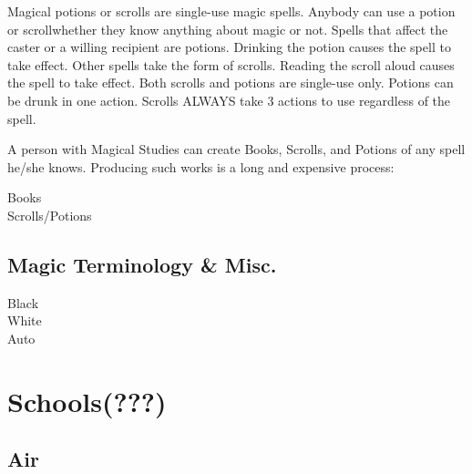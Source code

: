 \documentclass[twoside]{book}
\begin{document}
    {  
     Magical potions or scrolls are single-use magic
               spells. Anybody can use a potion or scrollwhether
               they know anything about magic or not. Spells that affect
               the caster or a willing recipient are potions. Drinking
               the potion causes the spell to take effect. Other spells
               take the form of scrolls. Reading the scroll aloud causes
               the spell to take effect. Both scrolls and potions are
               single-use only. Potions can be drunk in one action.
               Scrolls ALWAYS take 3 actions to use regardless of the
               spell. 
    }
  
    {  
     A person with Magical Studies can create Books,
               Scrolls, and Potions of any spell he/she knows. Producing
               such works is a long and expensive process: 
    }
  
\begin{description}
    
  \item[ Books ] 
  \item[ Scrolls/Potions ] 
\end{description}
  
    

\subsection{Magic Terminology \& Misc.}
    
\begin{description}
    
  \item[ Black ] 
  \item[ White ] 
  \item[ Auto ] 
\end{description}
  
    

\section{Schools(???)}
    
    

\subsection{Air}
    
\end{document}
